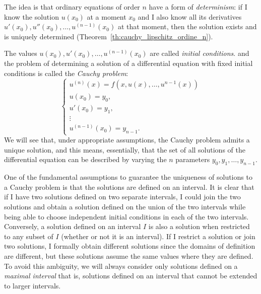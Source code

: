 The idea is that ordinary equations of order $n$ 
have a form of \emph{determinism}:
if I know the solution $u(x_0)$ at a moment $x_0$ 
and I also know all its derivatives $u'(x_0), u''(x_0), \dots, u^{(n-1)}(x_0)$ 
at that moment, then the solution exists and is uniquely determined
(Theorem~\ref{th:cauchy_lipschitz_ordine_n}).

The values $u(x_0), u'(x_0), \dots, u^{(n-1)}(x_0)$ are called \emph{initial
conditions}.
and the problem of determining a solution of a differential equation
%
%
with fixed initial conditions is called the \emph{Cauchy problem}:
%
%
\[
  \begin{cases}
  u^{(n)}(x) = f(x, u(x), \dots, u^{n-1}(x))\\
  u(x_0) = y_0, \\
  u'(x_0) = y_1, \\
  \vdots\\
  u^{(n-1)}(x_0) = y_{n-1}.
  \end{cases}
\]
We will see that, under appropriate assumptions, the Cauchy problem
admits a unique solution, and this means, essentially,
that the set of all solutions of the differential equation
can be described by varying
the $n$ parameters $y_0, y_1, \dots, y_{n-1}$.

One of the fundamental assumptions to guarantee the uniqueness of
solutions to a Cauchy problem is that the solutions are
defined on an interval. It is clear that if I have two
solutions defined on two separate intervals, I could join
the two solutions and obtain a solution defined on the union of
the two intervals while being able to choose independent initial conditions 
in each of the two intervals. 
Conversely, a solution defined
on an interval $I$ is also a solution when restricted to any subset
of $I$ (whether or not it is an interval).
If I restrict a solution or join two solutions, I formally obtain
different solutions since the domains of definition are different, but
these solutions assume the same values where they are defined.
To avoid this ambiguity, we will always consider only
solutions defined on a \emph{maximal interval}%
 that is,
solutions defined on an interval that cannot be
extended to larger intervals.